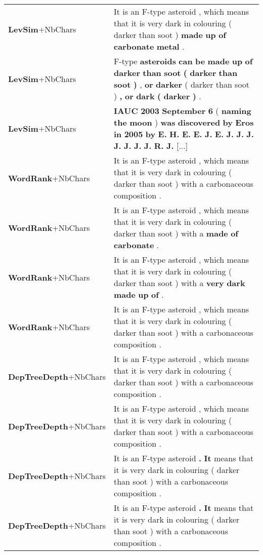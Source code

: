 \documentclass[10pt, a4paper]{article}
\begin{document}
\begin{table*}
{\begin{tabular}{ll}
\textbf{LevSim}\footnotesize{+NbChars} & It is an F-type asteroid , which means that it is very dark in colouring ( darker than soot ) \textbf{made} \textbf{up} \textbf{of} \textbf{carbonate} \textbf{metal} . \\
\textbf{LevSim}\footnotesize{+NbChars} & F-type \textbf{asteroids} \textbf{can} \textbf{be} \textbf{made} \textbf{up} \textbf{of} \textbf{darker} \textbf{than} \textbf{soot} \textbf{(} \textbf{darker} \textbf{than} \textbf{soot} \textbf{)} , \textbf{or} \textbf{darker} ( darker than soot ) \textbf{,} \textbf{or} \textbf{dark} \textbf{(} \textbf{darker} \textbf{)} . \\
\textbf{LevSim}\footnotesize{+NbChars} & \textbf{IAUC} \textbf{2003} \textbf{September} \textbf{6} ( \textbf{naming} \textbf{the} \textbf{moon} ) \textbf{was} \textbf{discovered} \textbf{by} \textbf{Eros} \textbf{in} \textbf{2005} \textbf{by} \textbf{E.} \textbf{H.} \textbf{E.} \textbf{E.} \textbf{J.} \textbf{E.} \textbf{J.} \textbf{J.} \textbf{J.} \textbf{J.} \textbf{J.} \textbf{J.} \textbf{J.} \textbf{R.} \textbf{J.} [...] \\
\midrule
\textbf{WordRank}\footnotesize{+NbChars} & It is an F-type asteroid , which means that it is very dark in colouring ( darker than soot ) with a carbonaceous composition . \\
\textbf{WordRank}\footnotesize{+NbChars} & It is an F-type asteroid , which means that it is very dark in colouring ( darker than soot ) with a \textbf{made} \textbf{of} \textbf{carbonate} . \\
\textbf{WordRank}\footnotesize{+NbChars} & It is an F-type asteroid , which means that it is very dark in colouring ( darker than soot ) with a \textbf{very} \textbf{dark} \textbf{made} \textbf{up} \textbf{of} . \\
\textbf{WordRank}\footnotesize{+NbChars} & It is an F-type asteroid , which means that it is very dark in colouring ( darker than soot ) with a carbonaceous composition . \\
\midrule
\textbf{DepTreeDepth}\footnotesize{+NbChars} & It is an F-type asteroid , which means that it is very dark in colouring ( darker than soot ) with a carbonaceous composition . \\
\textbf{DepTreeDepth}\footnotesize{+NbChars} & It is an F-type asteroid , which means that it is very dark in colouring ( darker than soot ) with a carbonaceous composition . \\
\textbf{DepTreeDepth}\footnotesize{+NbChars} & It is an F-type asteroid \textbf{.} \textbf{It} means that it is very dark in colouring ( darker than soot ) with a carbonaceous composition . \\
\textbf{DepTreeDepth}\footnotesize{+NbChars} & It is an F-type asteroid \textbf{.} \textbf{It} means that it is very dark in colouring ( darker than soot ) with a carbonaceous composition . \\
    \bottomrule


\end{tabular}}
\end{table*}
\end{document}
